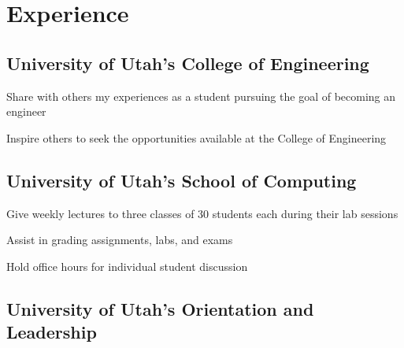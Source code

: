 \documentclass[letterpaper]{outline} %
\begin{document}
\begin{minipage}[t]{0.64\textwidth} %
\sectionspace

\section{Experience}

\subsection{University of Utah's College of Engineering    }

\vspace{\topsep} %
\begin{tightitemize}
\item Share with others my experiences as a student pursuing the goal of becoming an engineer 
\item Inspire others to seek the opportunities available at the College of Engineering
\end{tightitemize}

\sectionspace


\subsection{University of Utah's School of Computing}

\begin{tightitemize}
\item Give weekly lectures to three classes of 30 students each during their lab sessions
\item Assist in grading assignments, labs, and exams
\item Hold office hours for individual student discussion
\sectionspace

\end{tightitemize}


\subsection{University of Utah's Orientation and Leadership}

\end{minipage}
\end{document}

